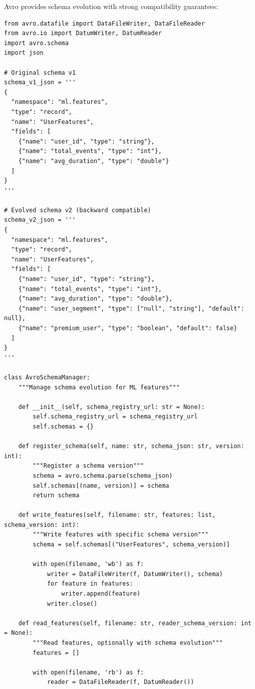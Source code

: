 Avro provides schema evolution with strong compatibility guarantees:

\begin{lstlisting}[style=python, caption=Schema evolution with Apache Avro]
from avro.datafile import DataFileWriter, DataFileReader
from avro.io import DatumWriter, DatumReader
import avro.schema
import json

# Original schema v1
schema_v1_json = '''
{
  "namespace": "ml.features",
  "type": "record",
  "name": "UserFeatures",
  "fields": [
    {"name": "user_id", "type": "string"},
    {"name": "total_events", "type": "int"},
    {"name": "avg_duration", "type": "double"}
  ]
}
'''

# Evolved schema v2 (backward compatible)
schema_v2_json = '''
{
  "namespace": "ml.features",
  "type": "record",
  "name": "UserFeatures",
  "fields": [
    {"name": "user_id", "type": "string"},
    {"name": "total_events", "type": "int"},
    {"name": "avg_duration", "type": "double"},
    {"name": "user_segment", "type": ["null", "string"], "default": null},
    {"name": "premium_user", "type": "boolean", "default": false}
  ]
}
'''

class AvroSchemaManager:
    """Manage schema evolution for ML features"""

    def __init__(self, schema_registry_url: str = None):
        self.schema_registry_url = schema_registry_url
        self.schemas = {}

    def register_schema(self, name: str, schema_json: str, version: int):
        """Register a schema version"""
        schema = avro.schema.parse(schema_json)
        self.schemas[(name, version)] = schema
        return schema

    def write_features(self, filename: str, features: list, schema_version: int):
        """Write features with specific schema version"""
        schema = self.schemas[("UserFeatures", schema_version)]

        with open(filename, 'wb') as f:
            writer = DataFileWriter(f, DatumWriter(), schema)
            for feature in features:
                writer.append(feature)
            writer.close()

    def read_features(self, filename: str, reader_schema_version: int = None):
        """Read features, optionally with schema evolution"""
        features = []

        with open(filename, 'rb') as f:
            reader = DataFileReader(f, DatumReader())


\end{lstlisting}
